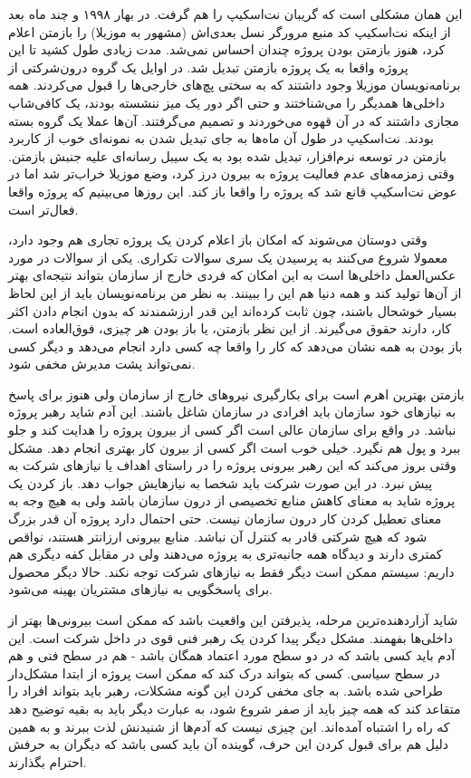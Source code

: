 این همان مشکلی است که گریبان نت‌اسکیپ را هم گرفت. در بهار ۱۹۹۸ و چند
ماه بعد از اینکه نت‌اسکیپ کد منبع مرورگر نسل بعدی‌اش (مشهور به موزیلا)
را بازمتن اعلام کرد، هنوز بازمتن بودن پروژه چندان احساس نمی‌شد. مدت
زیادی طول کشید تا این پروژه واقعا به یک پروژه بازمتن تبدیل شد. در
اوایل یک گروه درون‌شرکتی از برنامه‌نویسان موزیلا وجود داشتند که به سختی
پچ‌های خارجی‌ها را قبول می‌کردند. همه داخلی‌ها همدیگر را می‌شناختند و حتی
اگر دور یک میز ننشسته بودند، یک کافی‌شاپ مجازی داشتند که در آن‌ قهوه
می‌خوردند و تصمیم‌ می‌گرفتند. آن‌ها عملا یک گروه بسته بودند. نت‌اسکیپ در
طول آن‌ ماه‌ها به جای تبدیل شدن به نمونه‌ای خوب از کاربرد بازمتن در توسعه
نرم‌افزار، تبدیل شده بود به یک سیبل رسانه‌ای علیه جنبش بازمتن. وقتی
زمزمه‌های عدم فعالیت پروژه به بیرون درز کرد، وضع موزیلا خراب‌تر شد اما
در عوض نت‌اسکیپ قانع شد که پروژه را واقعا باز کند. این روزها می‌بینیم که
پروژه واقعا فعال‌تر است.

وقتی دوستان می‌شوند که امکان باز اعلام کردن یک پروژه تجاری هم وجود
دارد، معمولا شروع می‌کنند به پرسیدن یک سری سوالات تکراری. یکی از سوالات
در مورد عکس‌العمل داخلی‌ها است به این امکان که فردی خارج از سازمان
بتواند نتیجه‌ای بهتر از آن‌ها تولید کند و همه دنیا هم این را ببینند. به
نظر من برنامه‌نویسان باید از این لحاظ بسیار خوشحال باشند، چون ثابت
کرده‌اند این قدر ارزشمندند که بدون انجام دادن اکثر کار،‌ دارند حقوق
می‌گیرند. از این نظر بازمتن، یا باز بودن هر چیزی، فوق‌العاده است. باز
بودن به همه نشان می‌دهد که کار را واقعا چه کسی دارد انجام می‌دهد و دیگر
کسی نمی‌تواند پشت مدیرش مخفی شود.

بازمتن بهترین اهرم است برای بکارگیری نیروهای خارج از سازمان ولی هنوز
برای پاسخ به نیازهای خود سازمان باید افرادی در سازمان شاغل باشند. این
آدم شاید رهبر پروژه نباشد. در واقع برای سازمان عالی است اگر کسی از
بیرون پروژه را هدایت کند و جلو ببرد و پول هم نگیرد. خیلی خوب است اگر
کسی از بیرون کار بهتری انجام دهد. مشکل وقتی بروز می‌کند که این رهبر
بیرونی پروژه را در راستای اهداف یا نیازهای شرکت به پیش نبرد. در این
صورت شرکت باید شخصا به نیازهایش جواب دهد. باز کردن یک پروژه شاید به
معنای کاهش منابع تخصیصی از درون سازمان باشد ولی به هیچ وجه به معنای
تعطیل کردن کار درون سازمان نیست. حتی احتمال دارد پروژه آن قدر بزرگ شود
که هیچ شرکتی قادر به کنترل آن نباشد. منابع بیرونی ارزانتر هستند، نواقص
کمتری دارند و دیدگاه همه جانبه‌تری به پروژه می‌دهند ولی در مقابل کفه
دیگری هم داریم: سیستم ممکن است دیگر فقط به نیازهای شرکت توجه نکند. حالا
دیگر محصول برای پاسخگویی به نیازهای مشتریان بهینه می‌شود.

شاید آزاردهنده‌ترین مرحله، پذیرفتن این واقعیت باشد که ممکن است بیرونی‌ها
بهتر از داخلی‌ها بفهمند. مشکل دیگر پیدا کردن یک رهبر فنی قوی در داخل
شرکت است. این آدم باید کسی باشد که در دو سطح مورد اعتماد همگان باشد -
هم در سطح فنی و هم در سطح سیاسی. کسی که بتواند درک کند که ممکن است
پروژه از ابتدا مشکل‌دار طراحی شده باشد. به جای مخفی کردن این گونه
مشکلات، رهبر باید بتواند افراد را متقاعد کند که همه چیز باید از صفر
شروع شود، به عبارت دیگر باید به بقیه توضیح دهد که راه را اشتباه
آمده‌اند. این چیزی نیست که آدم‌ها از شنیدنش لذت ببرند و به همین دلیل هم
برای قبول کردن این حرف، گوینده آن باید کسی باشد که دیگران به حرفش
احترام بگذارند.

